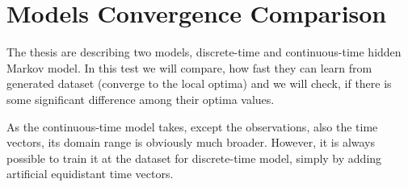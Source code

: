 \documentclass[thesis=M,english]{FITthesis}[2012/10/20]
\begin{document}
\section{Models Convergence Comparison}

The thesis are describing two models, discrete-time and continuous-time hidden Markov model. In this test we will compare, how fast they can learn from generated dataset (converge to the local optima) and we will check, if there is some significant difference among their optima values. 

As the continuous-time model takes, except the observations, also the time vectors, its domain range is obviously much broader. However, it is always possible to train it at the dataset for discrete-time model, simply by adding artificial equidistant time vectors.
\end{document}
